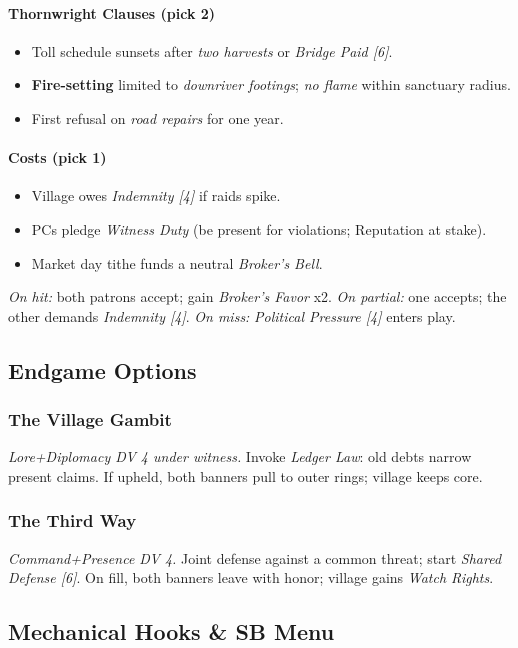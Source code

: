 \documentclass[11pt]{article}
\begin{document}
\paragraph{Thornwright Clauses (pick 2)}
\begin{itemize}[leftmargin=*]
  \item Toll schedule sunsets after \emph{two harvests} or \emph{Bridge Paid [6]}.
  \item \textbf{Fire-setting} limited to \emph{downriver footings}; \emph{no flame} within sanctuary radius.
  \item First refusal on \emph{road repairs} for one year.
\end{itemize}
\paragraph{Costs (pick 1)}
\begin{itemize}[leftmargin=*]
  \item Village owes \emph{Indemnity [4]} if raids spike.
  \item PCs pledge \emph{Witness Duty} (be present for violations; Reputation at stake).
  \item Market day tithe funds a neutral \emph{Broker's Bell}.
\end{itemize}
\textit{On hit:} both patrons accept; gain \emph{Broker's Favor} x2. \textit{On partial:} one accepts; the other demands \emph{Indemnity [4]}. \textit{On miss:} \emph{Political Pressure [4]} enters play.

\subsection*{Endgame Options}
\subsubsection*{The Village Gambit}
\emph{Lore+Diplomacy DV 4 under witness.} Invoke \emph{Ledger Law}: old debts narrow present claims. If upheld, both banners pull to outer rings; village keeps core.

\subsubsection*{The Third Way}
\emph{Command+Presence DV 4.} Joint defense against a common threat; start \emph{Shared Defense [6]}. On fill, both banners leave with honor; village gains \emph{Watch Rights}.

\subsection*{Mechanical Hooks \& SB Menu}
\end{document}
